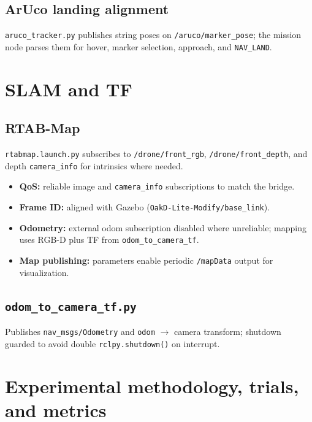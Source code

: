 \documentclass[11pt]{article}
\begin{document}
\subsection{ArUco landing alignment}
\texttt{aruco\_tracker.py} publishes string poses on \texttt{/aruco/marker\_pose}; the mission node parses them for hover, marker selection, approach, and \texttt{NAV\_LAND}.

\newpage
\section{SLAM and TF}
\subsection{RTAB-Map}
\texttt{rtabmap.launch.py} subscribes to \texttt{/drone/front\_rgb}, \texttt{/drone/front\_depth}, and depth \texttt{camera\_info} for intrinsics where needed.
\begin{itemize}[itemsep=2pt]
    \item \textbf{QoS:} reliable image and \texttt{camera\_info} subscriptions to match the bridge.
    \item \textbf{Frame ID:} aligned with Gazebo (\texttt{OakD-Lite-Modify/base\_link}).
    \item \textbf{Odometry:} external odom subscription disabled where unreliable; mapping uses RGB-D plus TF from \texttt{odom\_to\_camera\_tf}.
    \item \textbf{Map publishing:} parameters enable periodic \texttt{/mapData} output for visualization.
\end{itemize}

\subsection{\texttt{odom\_to\_camera\_tf.py}}
Publishes \texttt{nav\_msgs/Odometry} and \texttt{odom} $\rightarrow$ camera transform; shutdown guarded to avoid double \texttt{rclpy.shutdown()} on interrupt.

\newpage
\section{Experimental methodology, trials, and metrics}
\label{sec:trials}
\end{document}
